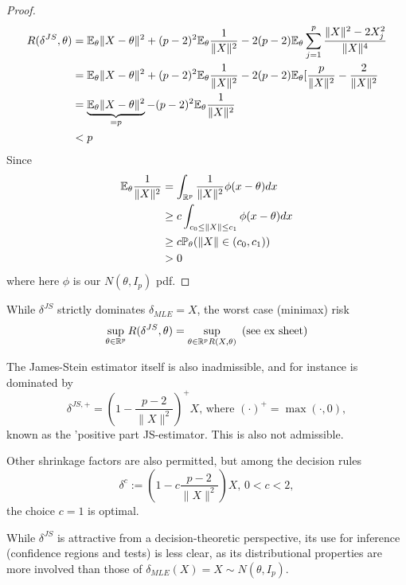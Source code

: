 \documentclass[a4paper]{article}
\begin{document}
\begin{proof}
\begin{align*}
	R(\delta^{JS}, \theta) &= \mathbb{E}_{\theta}\|X-\theta\|^2 + (p-2)^2\mathbb{E}_{\theta}\frac{1}{\|X\|^2} - 2(p-2) \mathbb{E}_{\theta} \sum_{j=1}^{p} \frac{ \|X\|^2 -2X_{j}^2}{\|X\|^{4}} \\
	&= \mathbb{E}_{\theta}\|X-\theta\|^2 + (p-2)^2\mathbb{E}_{\theta}\frac{1}{\|X\|^2} - 2(p-2) \mathbb{E}_{\theta} [\frac{p}{\|X\|^2} -\frac{2}{\|X\|^2} \\
	&= \underbrace{\mathbb{E}_{\theta}\|X-\theta\|^2}_{=p} - (p-2)^2\mathbb{E}_{\theta}\frac{1}{\|X\|^2} \\
	&<p
\end{align*}
Since
\begin{align*}
	\mathbb{E}_{\theta} \frac{1}{\|X\|^2} &= \int_{\mathbb{R}^{p}} \frac{1}{\|X\|^2} \phi(x-\theta) dx \\
	&\ge c \int_{c_0 \le \|X\| \le c_1} \phi(x-\theta)dx \\
	&\ge c \mathbb{P}_{\theta} (\|X\|\in (c_0, c_1)) \\
	&> 0
\end{align*}
where here $\phi$ is our $N(\theta, I_p )$ pdf.
\end{proof}

\begin{remark}
	\enumerate[label=\roman*)]
\item
	While $\delta^{JS}$ strictly dominates $\delta_{MLE} = X$, the worst case (minimax) risk
	\[
		\sup_{\theta \in \mathbb{R}^{p}} R(\delta^{JS}, \theta) = \sup_{\theta \in \mathbb{R}^{p} R(X, \theta)} \text{ (see ex sheet)}
	\] 

\item
	The James-Stein estimator itself is also inadmissible, and for instance is dominated by
	\[
		\delta^{JS, +} =  \left(1-\frac{p-2}{\|X\|^2}\right)^{+}X\text{, where } (\cdot )^{+} = \max(\cdot , 0)
	,\] known as the 'positive part JS-estimator. This is also not admissible.

\item
	Other shrinkage factors are also permitted, but among the decision rules
	\[
	\delta^{c} := \left(1-c \frac{p-2}{\|X\|^2}\right) X, \, 0<c<2
	,\] the choice $c=1$ is optimal.

\item While $\delta^{JS}$ is attractive from a decision-theoretic perspective, its use for inference (confidence regions and tests) is less clear, as its distributional properties are more involved than those of $\delta_{MLE}(X) = X \sim N(\theta, I_p)$.
\end{remark}

\newpage
\end{document}
